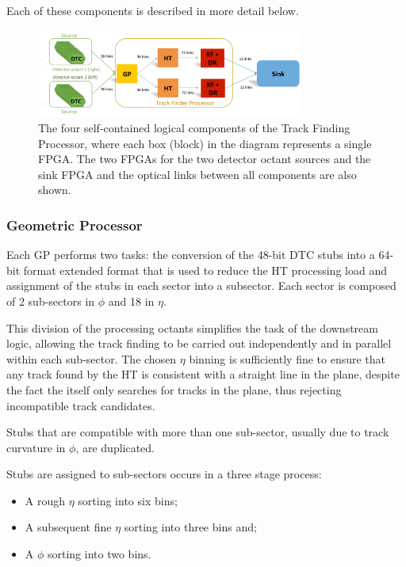 Each of these components is described in more detail below.

\begin{figure}[!h]
\centering
\includegraphics[width=0.78\textwidth]{figs/tk-upgrade/demoslice1.pdf}
\caption{The four self-contained logical components of the Track Finding Processor, where each box (block) in the diagram represents a single FPGA. The two FPGAs for the two detector octant sources and the sink FPGA and the optical links between all components are also shown.}
\label{fig:TFP}
\end{figure}

\subsubsection{Geometric Processor}\label{subsubsec:GP}
Each GP performs two tasks: the conversion of the 48-bit DTC stubs into a 64-bit format extended format that is used to reduce the HT processing load and assignment of the stubs in each sector into a subsector. 
Each sector is composed of 2 sub-sectors in $\phi$ and 18 in $\eta$.

This division of the processing octants simplifies the task of the downstream logic, allowing the track finding to be carried out independently and in parallel within each sub-sector. 
The chosen $\eta$ binning is sufficiently fine to ensure that any track found by the \rphi HT is consistent with a straight line in the \rz plane, despite the fact the \HT itself only searches for tracks in the \rphi plane, thus rejecting incompatible track candidates.

Stubs that are compatible with more than one sub-sector, usually due to track curvature in $\phi$, are duplicated. 

Stubs are assigned to sub-sectors occurs in a three stage process:
\begin{itemize}
\item A rough $\eta$ sorting into six bins;
\item A subsequent fine $\eta$ sorting into three bins and;
\item A $\phi$ sorting into two bins. 
\end{itemize}

